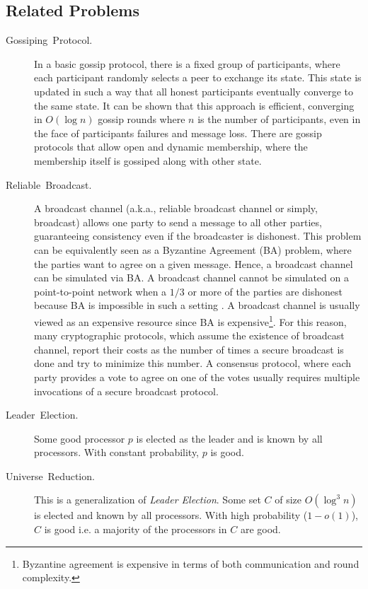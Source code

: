 \documentclass[10pt]{article}
\theoremstyle{plain}
\begin{document}
\subsection{Related Problems}
\begin{description}
	\item [{Gossiping~Protocol.}] In a basic gossip protocol, there is a fixed
	group of participants, where each participant randomly selects a peer
	to exchange its state. This state is updated in such a way that all
	honest participants eventually converge to the same state. It can
	be shown that this approach is efficient, converging in $O(\log n)$
	gossip rounds where $n$ is the number of participants, even in the
	face of participants failures and message loss. There are gossip protocols
	that allow open and dynamic membership, where the membership itself
	is gossiped along with other state.
	\item [{Reliable~Broadcast.}] A broadcast channel (a.k.a., reliable broadcast
	channel or simply, broadcast) allows one party to send a message to
	all other parties, guaranteeing consistency even if the broadcaster
	is dishonest. This problem can be equivalently seen as a Byzantine
	Agreement (BA) problem, where the parties want to agree on a given
	message. Hence, a broadcast channel can be simulated via BA. A broadcast
	channel cannot be simulated on a point-to-point network when a $1/3$
	or more of the parties are dishonest because BA is impossible in such
	a setting \cite{lsp82}. A broadcast channel is usually viewed as
	an expensive resource since BA is expensive\footnote{Byzantine agreement is expensive in terms of both communication and
		round complexity.}. For this reason, many cryptographic protocols, which assume the
	existence of broadcast channel, report their costs as the number of
	times a secure broadcast is done and try to minimize this number.
	A consensus protocol, where each party provides a vote to agree on
	one of the votes usually requires multiple invocations of a secure
	broadcast protocol.
	\item [{Leader~Election.}] Some good processor $p$ is elected as the
	leader and is known by all processors. With constant probability,
	$p$ is good.
	\item [{Universe~Reduction.}] This is a generalization of \emph{Leader
		Election}. Some set $C$ of size $O(\log^{3}{n})$ is elected and
	known by all processors. With high probability ($1-o(1)$), $C$ is
	good i.e. a majority of the processors in $C$ are good.
\end{description}
\end{document}

